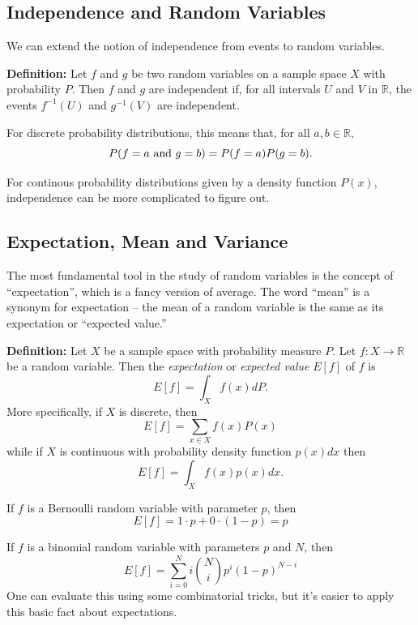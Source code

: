 \documentclass[
  11pt,
  letterpaper,
]{scrbook}
\theoremstyle{plain}
\theoremstyle{plain}
\theoremstyle{remark}
\begin{document}
\hypertarget{independence-and-random-variables}{%
\subsection{Independence and Random
Variables}\label{independence-and-random-variables}}

We can extend the notion of independence from events to random
variables.

\textbf{Definition:} Let \(f\) and \(g\) be two random variables on a
sample space \(X\) with probability \(P\). Then \(f\) and \(g\) are
independent if, for all intervals \(U\) and \(V\) in \(\mathbb{R}\), the
events \(f^{-1}(U)\) and \(g^{-1}(V)\) are independent.

For discrete probability distributions, this means that, for all
\(a,b\in\mathbb{R}\), \[
P(f=a\hbox{\ and\ }g=b)=P(f=a)P(g=b).
\]

For continous probability distributions given by a density function
\(P(x)\), independence can be more complicated to figure out.

\hypertarget{expectation-mean-and-variance}{%
\subsection{Expectation, Mean and
Variance}\label{expectation-mean-and-variance}}

The most fundamental tool in the study of random variables is the
concept of ``expectation'', which is a fancy version of average. The
word ``mean'' is a synonym for expectation -- the mean of a random
variable is the same as its expectation or ``expected value.''

\textbf{Definition:} Let \(X\) be a sample space with probability
measure \(P\). Let \(f:X\to \mathbb{R}\) be a random variable. Then the
\emph{expectation} or \emph{expected value} \(E[f]\) of \(f\) is \[
E[f] = \int_X f(x)dP.
\] More specifically, if \(X\) is discrete, then \[
E[f] = \sum_{x\in X} f(x)P(x)
\] while if \(X\) is continuous with probability density function
\(p(x)dx\) then \[
E[f] = \int_{X} f(x)p(x)dx.
\]

If \(f\) is a Bernoulli random variable with parameter \(p\), then \[
E[f] = 1\cdot p+0\cdot (1-p) = p
\]

If \(f\) is a binomial random variable with parameters \(p\) and \(N\),
then \[
E[f] = \sum_{i=0}^{N} i\binom{N}{i}p^{i}(1-p)^{N-i}
\] One can evaluate this using some combinatorial tricks, but it's
easier to apply this basic fact about expectations.
\end{document}
